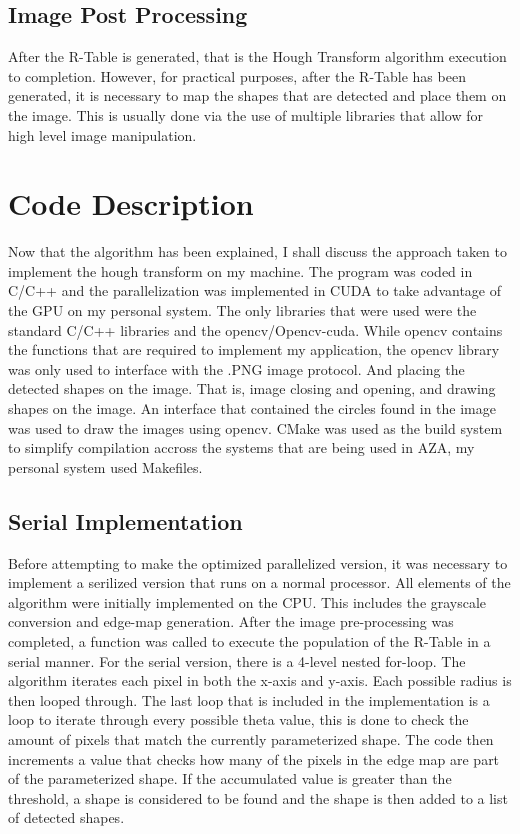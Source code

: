 \documentclass[conference]{IEEEtran}
\begin{document}
\subsection{Image Post Processing}
After the R-Table is generated, that is the Hough Transform algorithm execution to completion. 
However, for practical purposes, after the R-Table has been generated, it is necessary to map the shapes that are detected and place them on the image. 
This is usually done via the use of multiple libraries that allow for high level image manipulation. 


\section{Code Description}
Now that the algorithm has been explained, I shall discuss the approach taken to implement the hough transform on my machine. 
The program was coded in C/C++ and the parallelization was implemented in CUDA to take advantage of the GPU on my personal system. 
The only libraries that were used were the standard C/C++ libraries and the opencv/Opencv-cuda. 
While opencv contains the functions that are required to implement my application, the opencv library was only used to interface with the .PNG image protocol. And placing the detected shapes on the image.
That is, image closing and opening, and drawing shapes on the image.
An interface that contained the circles found in the image was used to draw the images using opencv. 
CMake was used as the build system to simplify compilation accross the systems that are being used in AZA, my personal system used Makefiles. 

\subsection{Serial Implementation}
Before attempting to make the optimized parallelized version, it was necessary to implement a serilized version that runs on a normal processor. 
All elements of the algorithm were initially implemented on the CPU. This includes the grayscale conversion and edge-map generation. 
After the image pre-processing was completed, a function was called to execute the population of the R-Table in a serial manner. 
For the serial version, there is a 4-level nested for-loop. The algorithm iterates each pixel in both the x-axis and y-axis. Each possible radius is then looped through. The last loop that is included in the implementation is a loop to iterate through every possible theta value, this is done to check the amount of pixels that match the currently parameterized shape. 
The code then increments a value that checks how many of the pixels in the edge map are part of the parameterized shape. 
If the accumulated value is greater than the threshold, a shape is considered to be found and the shape is then added to a list of detected shapes. 
\end{document}
